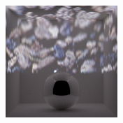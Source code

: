 \begin{figure}[]
\begin{subfigure}{\textwidth}
\begin{subfigure}{0.19\textwidth}
            \caption*{}
        \end{subfigure}
        \hfill
        \begin{subfigure}{0.19\textwidth}
            \centering
            \includegraphics[width=\textwidth]{images/04-experiment03/ball_dof/pebbles/pixel_proj.jpg}
            \caption*{}
        \end{subfigure}
        

\end{subfigure}
\end{figure}
